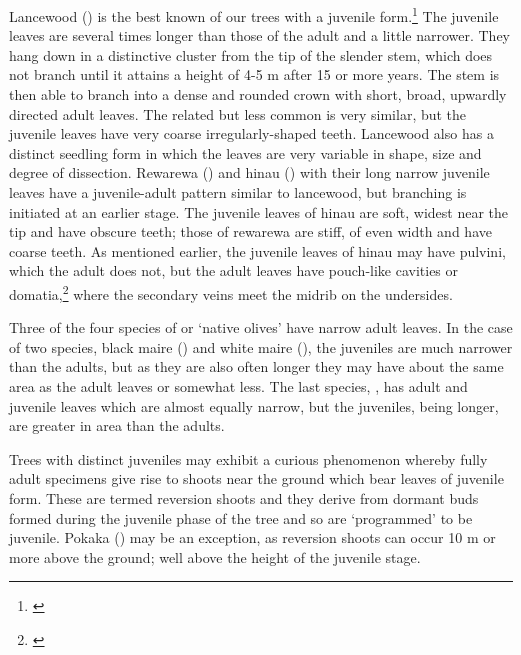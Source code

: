 Lancewood () is the best known of our trees with a juvenile form.\footnote{\cite{laing1906plants}}
The juvenile leaves are several times longer than those of the adult and a little narrower.
They hang down in a distinctive cluster from the tip of the slender stem, which does not branch until it attains a height of 4-5 m after 15 or more years.
The stem is then able to branch into a dense and rounded crown with short, broad, upwardly directed adult leaves.
The related but less common  is very similar, but the juvenile leaves have very coarse irregularly-shaped teeth.
Lancewood also has a distinct seedling form in which the leaves are very variable in shape, size and degree of dissection.
Rewarewa () and hinau () with their long narrow juvenile leaves have a juvenile-adult pattern similar to lancewood, but branching is initiated at an earlier stage.
The juvenile leaves of hinau are soft, widest near the tip and have obscure teeth; those of rewarewa are stiff, of even width and have coarse teeth.
As mentioned earlier, the juvenile leaves of hinau may have pulvini, which the adult does not, but the adult leaves have pouch-like cavities or domatia,\footnote{\cite{sampson1965domatia}} where the secondary veins meet the midrib on the undersides.

Three of the four species of  or `native olives' have narrow adult leaves.
In the case of two species, black maire () and white maire (), the juveniles are much narrower than the adults, but as they are also often longer they may have about the same area as the adult leaves or somewhat less.
The last species, , has adult and juvenile leaves which are almost equally narrow, but the juveniles, being longer, are greater in area than the adults.

Trees with distinct juveniles may exhibit a curious phenomenon whereby fully adult specimens give rise to shoots near the ground which bear leaves of juvenile form.
These are termed reversion shoots and they derive from dormant buds formed during the juvenile phase of the tree and so are `programmed' to be juvenile.
Pokaka () may be an exception, as reversion shoots can occur 10 m or more above the ground; well above the height of the juvenile stage.

